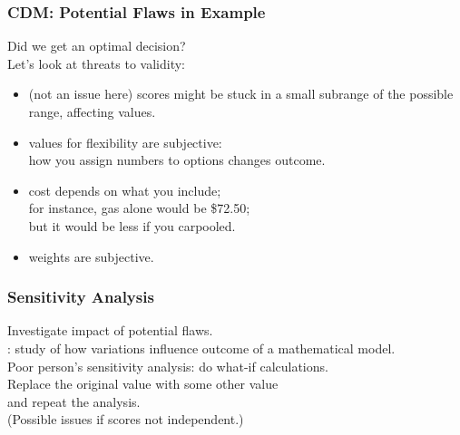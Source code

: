 \begin{frame}
\frametitle{CDM: Potential Flaws in Example}

\begin{changemargin}{1cm}

Did we get an optimal decision? \\

Let's look at threats to validity:

\begin{itemize}
\item (not an issue here) scores might be stuck in a
small subrange of the possible range, affecting values.
\item values for flexibility are subjective:\\
how you assign numbers to options changes  outcome.
\item cost depends on what you include; \\
for instance, gas alone would be \$72.50; \\
but it would be less if you carpooled.
\item weights are subjective.
\end{itemize}

\end{changemargin}

\end{frame}

\begin{frame}
\frametitle{Sensitivity Analysis}

\begin{changemargin}{1cm}
Investigate impact of potential flaws.\\[1em]

: study of how variations
influence outcome of a mathematical model.\\[1.5em]

Poor person's sensitivity analysis: do what-if
calculations.\\[1em]

Replace the original value with some other value\\
and repeat the analysis. \\

(Possible issues if scores not independent.)

\end{changemargin}

\end{frame}

